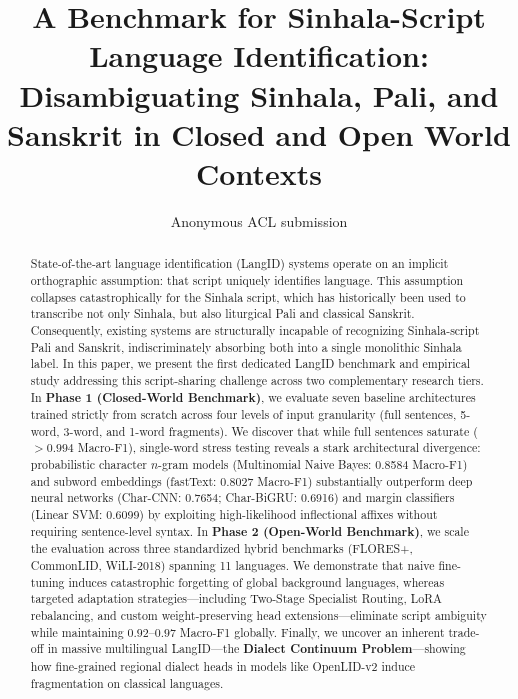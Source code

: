 \documentclass[11pt]{article}
\title{A Benchmark for Sinhala-Script Language Identification: \\ Disambiguating Sinhala, Pali, and Sanskrit in Closed and Open World Contexts}
\author{Anonymous ACL submission}
\begin{document}
\maketitle

\begin{abstract}
State-of-the-art language identification (LangID) systems operate on an implicit orthographic assumption: that script uniquely identifies language. This assumption collapses catastrophically for the Sinhala script, which has historically been used to transcribe not only Sinhala, but also liturgical Pali and classical Sanskrit. Consequently, existing systems are structurally incapable of recognizing Sinhala-script Pali and Sanskrit, indiscriminately absorbing both into a single monolithic Sinhala label. In this paper, we present the first dedicated LangID benchmark and empirical study addressing this script-sharing challenge across two complementary research tiers. In \textbf{Phase 1 (Closed-World Benchmark)}, we evaluate seven baseline architectures trained strictly from scratch across four levels of input granularity (full sentences, 5-word, 3-word, and 1-word fragments). We discover that while full sentences saturate ($>0.994$ Macro-F1), single-word stress testing reveals a stark architectural divergence: probabilistic character $n$-gram models (Multinomial Naive Bayes: 0.8584 Macro-F1) and subword embeddings (fastText: 0.8027 Macro-F1) substantially outperform deep neural networks (Char-CNN: 0.7654; Char-BiGRU: 0.6916) and margin classifiers (Linear SVM: 0.6099) by exploiting high-likelihood inflectional affixes without requiring sentence-level syntax. In \textbf{Phase 2 (Open-World Benchmark)}, we scale the evaluation across three standardized hybrid benchmarks (FLORES+, CommonLID, WiLI-2018) spanning 11 languages. We demonstrate that naive fine-tuning induces catastrophic forgetting of global background languages, whereas targeted adaptation strategies—including Two-Stage Specialist Routing, LoRA rebalancing, and custom weight-preserving head extensions—eliminate script ambiguity while maintaining $0.92$--$0.97$ Macro-F1 globally. Finally, we uncover an inherent trade-off in massive multilingual LangID—the \textbf{Dialect Continuum Problem}—showing how fine-grained regional dialect heads in models like OpenLID-v2 induce fragmentation on classical languages.
\end{abstract}
\end{document}
